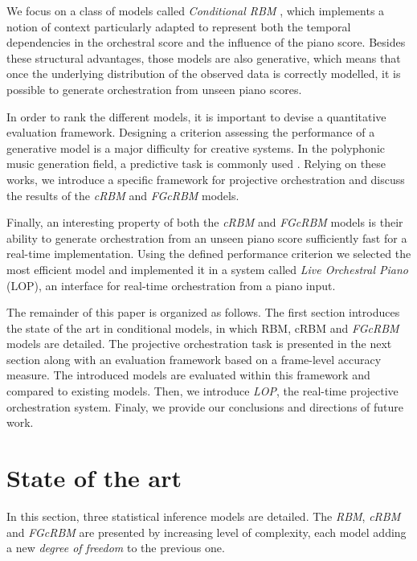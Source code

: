 \documentclass[letterpaper]{article}
\begin{document}
We focus on a class of models called \textit{Conditional RBM} \cite{taylor2006modeling}, which implements a notion of context particularly adapted to represent both the temporal dependencies in the orchestral score and the influence of the piano score.
Besides these structural advantages, those models are also generative, which means that once the underlying distribution of the observed data is correctly modelled, it is possible to generate orchestration from unseen piano scores.

In order to rank the different models, it is important to devise a quantitative evaluation framework. Designing a criterion assessing the performance of a generative model is a major difficulty for creative systems. In the polyphonic music generation field, a predictive task is commonly used \cite{DBLP:journals/corr/YaoCVDD15,boulanger2012modeling,lavrenko2003polyphonic}. Relying on these works, we introduce a specific framework for projective orchestration and discuss the results of the \textit{cRBM} and \textit{FGcRBM} models.

Finally, an interesting property of both the \textit{cRBM} and \textit{FGcRBM} models is their ability to generate orchestration from an unseen piano score sufficiently fast for a real-time implementation.
Using the defined performance criterion we selected the most efficient model and implemented it in a system called \textit{Live Orchestral Piano} (LOP), an interface for real-time orchestration from a piano input.

The remainder of this paper is organized as follows. The first section introduces the state of the art in conditional models, in which RBM, cRBM and \textit{FGcRBM} models are detailed. The projective orchestration task is presented in the next section along with an evaluation framework based on a frame-level accuracy measure. The introduced models are evaluated within this framework and compared to existing models. Then, we introduce \textit{LOP}, the real-time projective orchestration system. Finaly, we provide our conclusions and directions of future work.

\section{State of the art}
In this section, three statistical inference models are detailed. The \textit{RBM}, \textit{cRBM} and \textit{FGcRBM} are presented by increasing level of complexity, each model adding a new \textit{degree of freedom} to the previous one.
\end{document}
